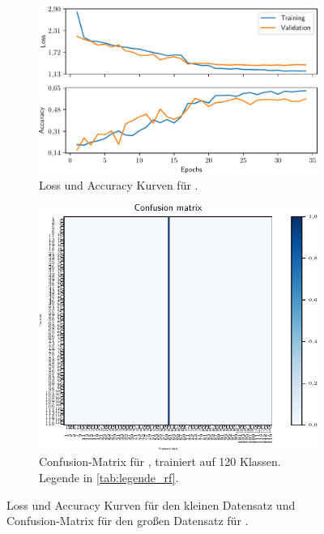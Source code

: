 \begin{figure}
  \begin{subfigure}{0.49\textwidth}
    \centering
    \includegraphics[width=\textwidth]{pics/ergebnisse/MiniDogNN/history.pdf}
    \caption{Loss und Accuracy Kurven für \MiniDog{}.}
    \label{fig:loss-acc-minidog}
  \end{subfigure}
  \qquad
  \begin{subfigure}{0.49\textwidth}
    \centering
    \includegraphics[width=\textwidth]{pics/ergebnisse/MiniDogNN/confusion_matrix_120.pdf}
    \caption{Confusion-Matrix für \MiniDog{}, trainiert auf 120 Klassen.
    Legende in \autoref{tab:legende_rf}.}
    \label{fig:confusion-mini-120}
  \end{subfigure}
  \caption{Loss und Accuracy Kurven für den kleinen Datensatz und Confusion-Matrix
  für den großen Datensatz für \MiniDog{}.}
  \label{fig:mischmasch-minidog}
\end{figure}

